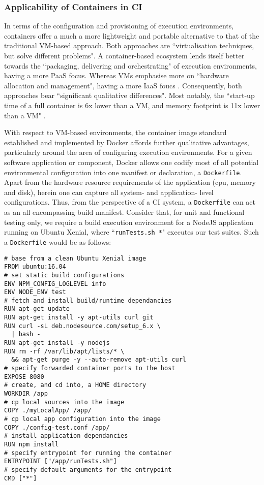 \documentclass{report}
\begin{document}
\subsubsection{Applicability of Containers in CI}
In terms of the configuration and provisioning of execution environments, containers  
offer a much a more lightweight and portable alternative to that of the traditional VM-based approach.
Both approaches are ``virtualisation
techniques, but solve different problems". A container-based ecosystem lends itself better 
towards the ``packaging, delivering and orchestrating" of execution environments, having
a more PaaS focus. Whereas VMs emphasise more on ``hardware allocation and management",
having a more IaaS foucs \citep{Claus}. Consequently, both approaches bear
``significant qualitative differences". Most notably, the ``start-up time of a full container is 6x lower than a
VM, and memory footprint is 11x lower than a VM" \citep{Agarwal}.
\par
With respect to VM-based environments, the container image standard established and implemented by Docker affords 
further qualitative advantages, particularly around the area of configuring execution environments.   
For a given software application or component, Docker allows
one codify most of all potential environmental configuration
into one manifest or declaration, a \texttt{Dockerfile}. Apart from the
hardware resource requirements of the application (cpu, memory and disk), 
herein one can capture all system- and application- level configurations. Thus,
from the perspective of a CI system, a  \texttt{Dockerfile} can
act as an all encompassing build manifest. Consider that, 
for unit and functional testing only, we require a build execution environment
for a NodeJS application running on Ubuntu Xenial, where ``\texttt{runTests.sh *}" executes our test suites.
Such a \texttt{Dockerfile} would be as follows:
\begin{verbatim}
# base from a clean Ubuntu Xenial image
FROM ubuntu:16.04
# set static build configurations
ENV NPM_CONFIG_LOGLEVEL info
ENV NODE_ENV test
# fetch and install build/runtime dependancies
RUN apt-get update
RUN apt-get install -y apt-utils curl git
RUN curl -sL deb.nodesource.com/setup_6.x \
  | bash -
RUN apt-get install -y nodejs 
RUN rm -rf /var/lib/apt/lists/* \
  && apt-get purge -y --auto-remove apt-utils curl
# specify forwarded container ports to the host
EXPOSE 8080
# create, and cd into, a HOME directory
WORKDIR /app
# cp local sources into the image
COPY ./myLocalApp/ /app/
# cp local app configuration into the image
COPY ./config-test.conf /app/
# install application dependancies
RUN npm install
# specify entrypoint for running the container 
ENTRYPOINT ["/app/runTests.sh"]
# specify default arguments for the entrypoint
CMD ["*"]
\end{verbatim}
\end{document}
